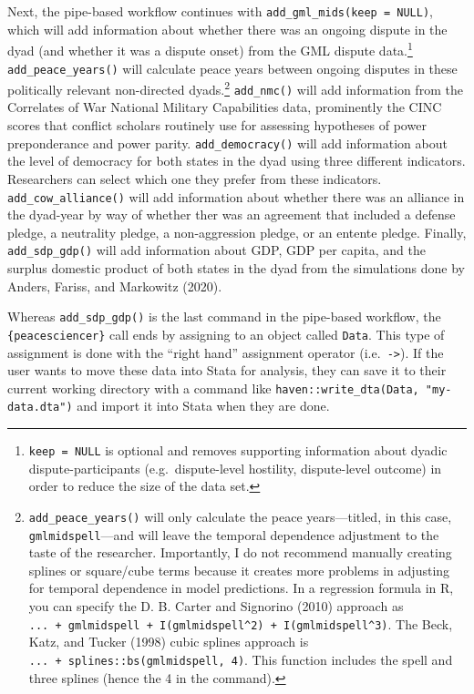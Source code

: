 \documentclass[
  11pt,
]{article}
\begin{document}
Next, the pipe-based workflow continues with \texttt{add\_gml\_mids(keep\ =\ NULL)}, which will add information about whether there was an ongoing dispute in the dyad (and whether it was a dispute onset) from the GML dispute data.\footnote{\texttt{keep\ =\ NULL} is optional and removes supporting information about dyadic dispute-participants (e.g.~dispute-level hostility, dispute-level outcome) in order to reduce the size of the data set.} \texttt{add\_peace\_years()} will calculate peace years between ongoing disputes in these politically relevant non-directed dyads.\footnote{\texttt{add\_peace\_years()} will only calculate the peace years---titled, in this case, \texttt{gmlmidspell}---and will leave the temporal dependence adjustment to the taste of the researcher. Importantly, I do not recommend manually creating splines or square/cube terms because it creates more problems in adjusting for temporal dependence in model predictions. In a regression formula in R, you can specify the D. B. Carter and Signorino (2010) approach as \texttt{...\ +\ gmlmidspell\ +\ I(gmlmidspell\^{}2)\ +\ I(gmlmidspell\^{}3)}. The Beck, Katz, and Tucker (1998) cubic splines approach is \texttt{...\ +\ splines::bs(gmlmidspell,\ 4)}. This function includes the spell and three splines (hence the 4 in the command).} \texttt{add\_nmc()} will add information from the Correlates of War National Military Capabilities data, prominently the CINC scores that conflict scholars routinely use for assessing hypotheses of power preponderance and power parity. \texttt{add\_democracy()} will add information about the level of democracy for both states in the dyad using three different indicators. Researchers can select which one they prefer from these indicators. \texttt{add\_cow\_alliance()} will add information about whether there was an alliance in the dyad-year by way of whether ther was an agreement that included a defense pledge, a neutrality pledge, a non-aggression pledge, or an entente pledge. Finally, \texttt{add\_sdp\_gdp()} will add information about GDP, GDP per capita, and the surplus domestic product of both states in the dyad from the simulations done by Anders, Fariss, and Markowitz (2020).

Whereas \texttt{add\_sdp\_gdp()} is the last command in the pipe-based workflow, the \texttt{\{peacesciencer\}} call ends by assigning to an object called \texttt{Data}. This type of assignment is done with the ``right hand'' assignment operator (i.e.~\texttt{-\textgreater{}}). If the user wants to move these data into Stata for analysis, they can save it to their current working directory with a command like \texttt{haven::write\_dta(Data,\ "my-data.dta")} and import it into Stata when they are done.
\end{document}
